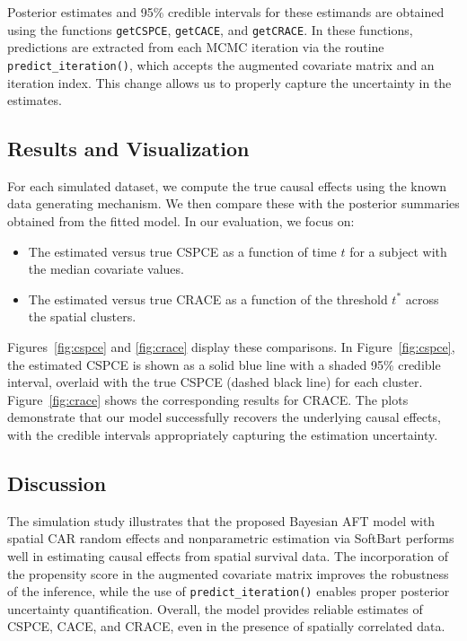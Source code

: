 \documentclass[useAMS,referee]{biom}
\begin{document}
Posterior estimates and 95\% credible intervals for these estimands are obtained using the functions \texttt{getCSPCE}, \texttt{getCACE}, and \texttt{getCRACE}. In these functions, predictions are extracted from each MCMC iteration via the routine \texttt{predict\_iteration()}, which accepts the augmented covariate matrix and an iteration index. This change allows us to properly capture the uncertainty in the estimates.

\subsection{Results and Visualization}

For each simulated dataset, we compute the true causal effects using the known data generating mechanism. We then compare these with the posterior summaries obtained from the fitted model. In our evaluation, we focus on:
\begin{itemize}
  \item The estimated versus true CSPCE as a function of time \( t \) for a subject with the median covariate values.
  \item The estimated versus true CRACE as a function of the threshold \( t^* \) across the spatial clusters.
\end{itemize}

Figures~\ref{fig:cspce} and \ref{fig:crace} display these comparisons. In Figure~\ref{fig:cspce}, the estimated CSPCE is shown as a solid blue line with a shaded 95\% credible interval, overlaid with the true CSPCE (dashed black line) for each cluster. Figure~\ref{fig:crace} shows the corresponding results for CRACE. The plots demonstrate that our model successfully recovers the underlying causal effects, with the credible intervals appropriately capturing the estimation uncertainty.

\subsection{Discussion}

The simulation study illustrates that the proposed Bayesian AFT model with spatial CAR random effects and nonparametric estimation via SoftBart performs well in estimating causal effects from spatial survival data. The incorporation of the propensity score in the augmented covariate matrix improves the robustness of the inference, while the use of \texttt{predict\_iteration()} enables proper posterior uncertainty quantification. Overall, the model provides reliable estimates of CSPCE, CACE, and CRACE, even in the presence of spatially correlated data.
\end{document}
